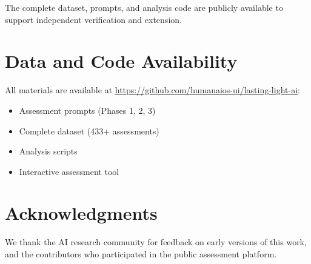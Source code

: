 \documentclass[11pt,a4paper]{article}
\begin{document}
The complete dataset, prompts, and analysis code are publicly available to support independent verification and extension.

\section*{Data and Code Availability}

All materials are available at \url{https://github.com/humanaios-ui/lasting-light-ai}:
\begin{itemize}
\item Assessment prompts (Phases 1, 2, 3)
\item Complete dataset (433+ assessments)
\item Analysis scripts
\item Interactive assessment tool
\end{itemize}

\section*{Acknowledgments}

We thank the AI research community for feedback on early versions of this work, and the contributors who participated in the public assessment platform.
\end{document}

